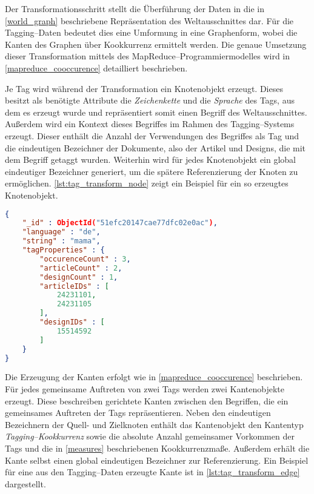Der Transformationsschritt stellt die Überführung der Daten in die in \cref{world_graph} beschriebene Repräsentation des Weltausschnittes dar. Für die Tagging--Daten bedeutet dies eine Umformung in eine Graphenform, wobei die Kanten des Graphen über Kookkurrenz ermittelt werden. Die genaue Umsetzung dieser Transformation mittels des MapReduce--Programmiermodelles wird in \cref{mapreduce_cooccurence} detailliert beschrieben.

Je Tag wird während der Transformation ein Knotenobjekt erzeugt. Dieses besitzt als benötigte Attribute die \emph{Zeichenkette} und die \emph{Sprache} des Tags, aus dem es erzeugt wurde und repräsentiert somit einen Begriff des Weltausschnittes. Außerdem wird ein Kontext dieses Begriffes im Rahmen des Tagging--Systems erzeugt. Dieser enthält die Anzahl der Verwendungen des Begriffes als Tag und die eindeutigen Bezeichner der Dokumente, also der Artikel und Designs, die mit dem Begriff getaggt wurden. Weiterhin wird für jedes Knotenobjekt ein global eindeutiger Bezeichner generiert, um die spätere Referenzierung der Knoten zu ermöglichen. \cref{lst:tag_transform_node} zeigt ein Beispiel für ein so erzeugtes Knotenobjekt.

\begin{lstlisting}[language=json, label={lst:tag_transform_node}, caption={JSON--Beispiel für einen aus den Tagging--Daten erzeugten Knoten}, float=h]
{
    "_id" : ObjectId("51efc20147cae77dfc02e0ac"),
    "language" : "de",
    "string" : "mama",
    "tagProperties" : {
        "occurenceCount" : 3,
        "articleCount" : 2,
        "designCount" : 1,
        "articleIDs" : [
            24231101,
            24231105
        ],
        "designIDs" : [
            15514592
        ]
    }
}
\end{lstlisting}

Die Erzeugung der Kanten erfolgt wie in \cref{mapreduce_cooccurence} beschrieben. Für jedes gemeinsame Auftreten von zwei Tags werden zwei Kantenobjekte erzeugt. Diese beschreiben gerichtete Kanten zwischen den Begriffen, die ein gemeinsames Auftreten der Tags repräsentieren. Neben den eindeutigen Bezeichnern der Quell- und Zielknoten enthält das Kantenobjekt den Kantentyp \emph{Tagging--Kookkurrenz} sowie die absolute Anzahl gemeinsamer Vorkommen der Tags und die in \cref{measures} beschriebenen Kookkurrenzmaße. Außerdem erhält die Kante selbst einen global eindeutigen Bezeichner zur Referenzierung. Ein Beispiel für eine aus den Tagging--Daten erzeugte Kante ist in \cref{lst:tag_transform_edge} dargestellt.

